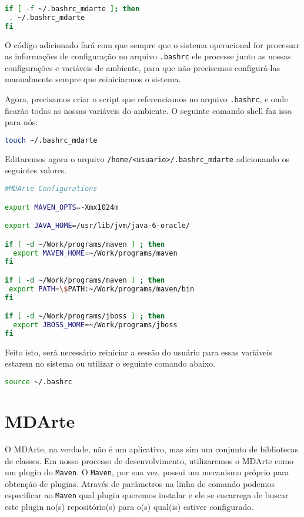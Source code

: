 \begin{lstlisting}[language=bash]
if [ -f ~/.bashrc_mdarte ]; then
 . ~/.bashrc_mdarte
fi
\end{lstlisting}

O código adicionado fará com que sempre que o sistema operacional for processar
as informações de configuração no arquivo \texttt{.bashrc} ele processe junto
as nossas configurações e variáveis de ambiente, para que não precisemos
configurá-las manualmente sempre que reiniciarmos o sistema. 

Agora, precisamos criar o script que referenciamos no arquivo
\texttt{.bashrc}, e onde ficarão todas as nossas variáveis do ambiente. O
seguinte comando shell faz isso para nós:

\begin{lstlisting}[language=bash]
touch ~/.bashrc_mdarte
\end{lstlisting}
	
Editaremos agora o arquivo \texttt{/home/<usuario>/.bashrc\_mdarte} adicionando
os seguintes valores.

\begin{lstlisting}[language=bash]
#MDArte Configurations

export MAVEN_OPTS=-Xmx1024m

export JAVA_HOME=/usr/lib/jvm/java-6-oracle/

if [ -d ~/Work/programs/maven ] ; then
  export MAVEN_HOME=~/Work/programs/maven
fi

if [ -d ~/Work/programs/maven ] ; then
 export PATH=\$PATH:~/Work/programs/maven/bin
fi

if [ -d ~/Work/programs/jboss ] ; then
  export JBOSS_HOME=~/Work/programs/jboss
fi
\end{lstlisting}

Feito isto, será necessário reiniciar a sessão do usuário para essas variáveis
estarem no sistema ou utilizar o seguinte comando abaixo.

\begin{lstlisting}[language=bash]
source ~/.bashrc
\end{lstlisting}

\section{MDArte}

O MDArte, na verdade, não é um aplicativo, mas sim um conjunto de bibliotecas de
classes. Em nosso processo de desenvolvimento, utilizaremos o MDArte como um
plugin do \texttt{Maven}. O \texttt{Maven}, por sua vez, possui um mecanismo
próprio para obtenção de plugins. Através de parâmetros na linha de comando
podemos especificar ao \texttt{Maven} qual plugin queremos instalar e ele se
encarrega de buscar este plugin no(s) repositório(s) para o(s) qual(is) estiver
configurado.

